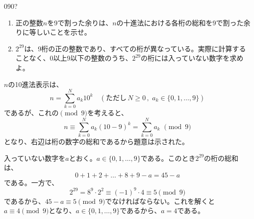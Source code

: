 \begin{prob}{090}{\hosi ?}{}
 \begin{enumerate}
  \item 正の整数$n$を9で割った余りは、$n$の十進法における各桁の総和を9で割った余りに等しいことを示せ。
  \item $2^{29}$は、9桁の正の整数であり、すべての桁が異なっている。実際に計算することなく、0以上9以下の整数のうち、$2^{29}$の桁には入っていない数字を求めよ。
 \end{enumerate}
\end{prob}
$n$の10進法表示は、
\[ n=\sum_{k=0}^N a_k 10^k \quad(\text{ただし}\, N\ge 0 \,,\,\, a_k\in\{0, 1, \dots, 9\}) \]
であるが、これの$\pmod{9}$を考えると、
\[ n\equiv \sum_{k=0}^N a_k(10-9)^k=\sum_{k=0}^N a_k \,\,\pmod{9} \]
となり、右辺は桁の数字の総和であるから題意は示された。

入っていない数字を$a$とおく。$a\in\{0, 1, \dots, 9\}$である。このとき$2^{29}$の桁の総和は、
\[ 0+1+2+\dots+8+9-a=45-a \]
である。一方で、
\[ 2^{29}=8^9\cdot2^2\equiv (-1)^9\cdot 4\equiv 5 \pmod{9} \]
であるから、$45-a\equiv 5 \pmod{9}$でなければならない。これを解くと$a\equiv 4 \pmod{9}$となり、$a\in\{0, 1, \dots, 9\}$であるから、$a=4$である。